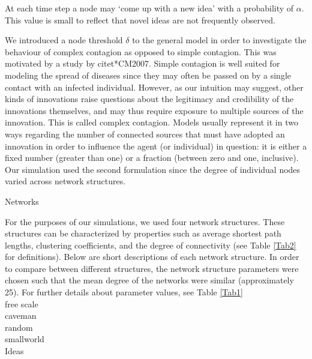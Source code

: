 \documentclass{beamer}
\begin{document}
\begin{frame}

At each time step a node may `come up with a new idea' with a probability of $\alpha$. This value is small to reflect that novel ideas are not frequently observed.


We introduced a node threshold $\delta$ to the general model in order to investigate the behaviour of complex contagion as opposed to simple contagion. This was motivated by a study by \alert{citet*{CM2007}}. Simple contagion is well suited for modeling the spread of diseases since they may often be passed on by a single contact with an infected individual. However, as our intuition may suggest, other kinds of innovations raise questions about the legitimacy and credibility of the innovations themselves, and may thus require exposure to multiple sources of the innovation. This is called complex contagion. Models usually represent it in two ways regarding the number of connected sources that must have adopted an innovation in order to influence the agent (or individual) in question: it is either a fixed number (greater than one) or a fraction (between zero and one, inclusive). Our simulation used the second formulation since the degree of individual nodes varied across network structures.
\end{frame}
%
\begin{frame}
{Networks}

For the purposes of our simulations, we used four network structures. These structures can be characterized by properties such as average shortest path lengths, clustering coefficients, and the degree of connectivity (see Table \ref{Tab2} for definitions). Below are short descriptions of each network structure. In order to compare between different structures, the network structure parameters were chosen such that the mean degree of the networks were similar (approximately 25). For further details about parameter values, see Table \ref{Tab1}\\
free scale\\
caveman\\
random\\
smallworld\\
{Ideas}
\end{frame}
\end{document}
